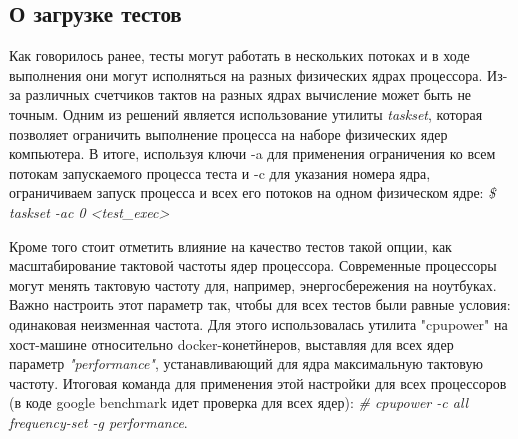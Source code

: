 
\subsection{О загрузке тестов}
    Как говорилось ранее, тесты могут работать в нескольких потоках и в ходе выполнения они могут исполняться на разных физических ядрах процессора. Из-за различных счетчиков тактов на разных ядрах вычисление может быть не точным. Одним из решений является использование утилиты \textit{taskset}, которая позволяет ограничить выполнение процесса на наборе физических ядер компьютера. В итоге, используя ключи -a для применения ограничения ко всем потокам запускаемого процесса теста и -c для указания номера ядра, ограничиваем запуск процесса и всех его потоков на одном физическом ядре: \textit{\$ taskset -ac 0 <test_exec>} 

    Кроме того стоит отметить влияние на качество тестов такой опции, как масштабирование тактовой частоты ядер процессора. Современные процессоры могут менять тактовую частоту для, например, энергосбережения на ноутбуках. Важно настроить этот параметр так, чтобы для всех тестов были равные условия: одинаковая неизменная частота. Для этого использовалась утилита "cpupower" на хост-машине относительно docker-конетйнеров, выставляя для всех ядер параметр \textit{"performance"}, устанавливающий для ядра максимальную тактовую частоту. Итоговая команда для применения этой настройки для всех процессоров (в коде google benchmark идет проверка для всех ядер): \textit{\# cpupower -c all frequency-set -g performance}.
